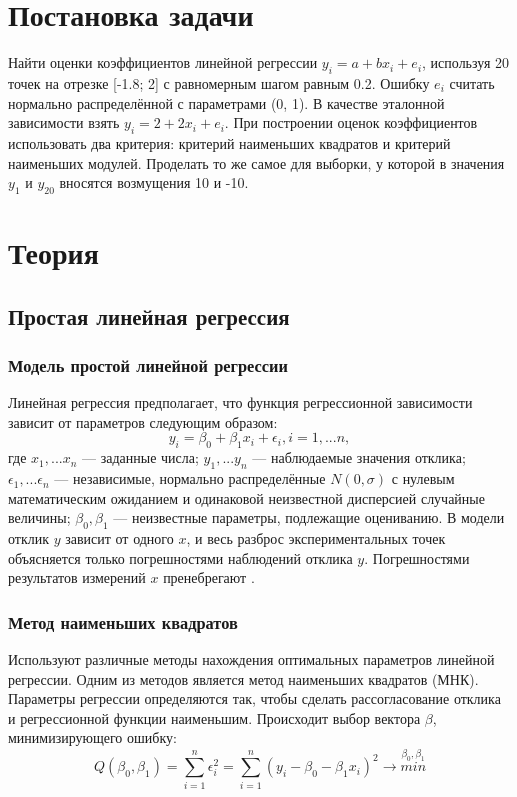 \newpage
\listoffigures


\newpage
\section{Постановка задачи}
Найти оценки коэффициентов линейной регрессии $y_i = a+bx_i+e_i$, используя 20 точек на отрезке [-1.8; 2] с равномерным шагом равным 0.2. Ошибку $e_i$ считать нормально распределённой с параметрами (0, 1). В качестве эталонной зависимости взять $y_i = 2+2x_i+e_i$. При построении оценок коэффициентов использовать два критерия: критерий наименьших квадратов и критерий наименьших модулей. Проделать то же самое для выборки, у которой в значения $y_1$ и $y_{20}$ вносятся возмущения 10 и -10.

\section{Теория}

\subsection{Простая линейная регрессия}
\subsubsection{Модель простой линейной регрессии}
Линейная регрессия предполагает, что функция регрессионной зависимости зависит от параметров следующим образом:
\begin{equation} \label{eq:K}
y_i = \beta_0 + \beta_1x_i + \epsilon_i, i = 1, ... n,
\end{equation}
где $x_1, ... x_n$ — заданные числа; $y_1, ... y_n$ — наблюдаемые значения отклика;
$\epsilon_1, ... \epsilon_n$ — независимые, нормально распределённые $N(0, \sigma)$ с нулевым математическим ожиданием и одинаковой неизвестной дисперсией случайные величины; $\beta_0, \beta_1$ — неизвестные параметры, подлежащие оцениванию.
В модели отклик $y$ зависит от одного $x$, и весь разброс экспериментальных точек объясняется только погрешностями наблюдений отклика $y$. Погрешностями результатов измерений $x$ пренебрегают \cite{theory}.

\subsubsection{Метод наименьших квадратов}
Используют различные методы нахождения оптимальных параметров линейной регрессии. Одним из методов является метод наименьших квадратов (МНК). Параметры регрессии определяются так, чтобы сделать рассогласование отклика и регрессионной функции наименьшим. Происходит выбор вектора $\beta$, минимизирующего ошибку:
\begin{equation} \label{eq:Q}
Q(\beta_0, \beta_1) = \sum\limits_{i=1}^n \epsilon^2_i = \sum\limits_{i=1}^n(y_i - \beta_0 - \beta_1x_i)^2 \rightarrow  \stackrel{\beta_0, \beta_1}{min}
\end{equation}

